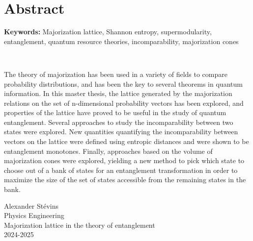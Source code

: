 \chapter*{Abstract}


\textbf{Keywords:} Majorization lattice, Shannon entropy, supermodularity, entanglement, quantum resource theories, incomparability, majorization cones

~

The theory of majorization has been used in a variety of fields to compare probability distributions, and has been the key to several theorems in quantum information. In this master thesis, the lattice generated by the majorization relations on the set of n-dimensional probability vectors has been explored, and properties of the lattice have proved to be useful in the study of quantum entanglement. Several approaches to study the incomparability between two states were explored. New quantities quantifying the incomparability between vectors on the lattice were defined using entropic distances and were shown to be entanglement monotones. Finally, approaches based on the volume of majorization cones were explored, yielding a new method to pick which state to choose out of a bank of states for an entanglement transformation in order to maximize the size of the set of states accessible from the remaining states in the bank.

\vspace*{\fill}
\noindent Alexander Stévins\\
Physics Engineering\\
Majorization lattice in the theory of entanglement\\
2024-2025
